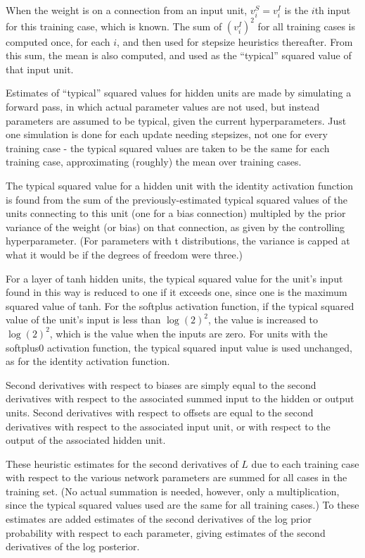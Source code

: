 \documentclass{report}[11pt]
\begin{document}
When the weight is on a connection from an input unit, $v^S_i = v^I_i$
is the $i$th input for this training case, which is known.  The sum of
$(v^I_i)^2$ for all training cases is computed once, for each $i$, and
then used for stepsize heuristics thereafter.  From this sum, the
mean is also computed, and used as the ``typical'' squared value of
that input unit.

Estimates of ``typical'' squared values for hidden units are made by
simulating a forward pass, in which actual parameter values are not
used, but instead parameters are assumed to be typical, given the
current hyperparameters.  Just one simulation is done for each update
needing stepsizes, not one for every training case - the typical
squared values are taken to be the same for each training case,
approximating (roughly) the mean over training cases.

The typical squared value for a hidden unit with the identity
activation function is found from the sum of the previously-estimated
typical squared values of the units connecting to this unit (one for a
bias connection) multipled by the prior variance of the weight (or
bias) on that connection, as given by the controlling hyperparameter.
(For parameters with t distributions, the variance is capped at what
it would be if the degrees of freedom were three.)

For a layer of tanh hidden units, the typical squared value for the
unit's input found in this way is reduced to one if it exceeds one,
since one is the maximum squared value of tanh.  For the softplus
activation function, if the typical squared value of the unit's input
is less than $\log(2)^2$, the value is increased to $\log(2)^2$, which
is the value when the inputs are zero. For units with the softplus0
activation function, the typical squared input value is used
unchanged, as for the identity activation function.

Second derivatives with respect to biases are simply equal to the
second derivatives with respect to the associated summed input to the
hidden or output units.  Second derivatives with respect to offsets
are equal to the second derivatives with respect to the associated
input unit, or with respect to the output of the associated hidden
unit.

These heuristic estimates for the second derivatives of $L$ due to
each training case with respect to the various network parameters are
summed for all cases in the training set.  (No actual summation is
needed, however, only a multiplication, since the typical squared
values used are the same for all training cases.)  To these estimates
are added estimates of the second derivatives of the log prior
probability with respect to each parameter, giving estimates of the
second derivatives of the log posterior.
\end{document}
